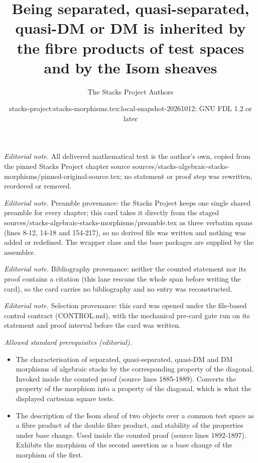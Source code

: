 \documentclass[10pt,a4paper]{amsart}
\title{Being separated, quasi-separated, quasi-DM or DM is inherited by the fibre products of test spaces and by the Isom sheaves}
\author{The Stacks Project Authors}
\date{stacks-project:stacks-morphisms.tex:local-snapshot-20261012; GNU FDL 1.2 or later}
\theoremstyle{plain}
\theoremstyle{definition}
\theoremstyle{remark}
\numberwithin{equation}{subsection}
\begin{document}
\maketitle
\noindent\textit{Editorial note.} All delivered mathematical text is the author's own, copied from the pinned Stacks Project chapter source sources/stacks-algebraic-stacks-morphisms/pinned-original-source.tex; no statement or proof step was rewritten, reordered or removed.\par\medskip
\noindent\textit{Editorial note.} Preamble provenance: the Stacks Project keeps one single shared preamble for every chapter; this card takes it directly from the staged sources/stacks-algebraic-stacks-morphisms/preamble.tex as three verbatim spans (lines 8-12, 14-18 and 154-217), so no derived file was written and nothing was added or redefined. The wrapper class and the base packages are supplied by the assembler.\par\medskip
\noindent\textit{Editorial note.} Bibliography provenance: neither the counted statement nor its proof contains a citation (this lane rescans the whole span before writing the card), so the card carries no bibliography and no entry was reconstructed.\par\medskip
\noindent\textit{Editorial note.} Selection provenance: this card was opened under the file-based control contract (CONTROL.md), with the mechanical pre-card gate run on its statement and proof interval before the card was written.\par\medskip
\noindent\textit{Allowed standard prerequisites (editorial).}\begin{itemize}
\item The characterisation of separated, quasi-separated, quasi-DM and DM morphisms of algebraic stacks by the corresponding property of the diagonal. Invoked inside the counted proof (source lines 1885-1889). Converts the property of the morphism into a property of the diagonal, which is what the displayed cartesian square tests.
\item The description of the Isom sheaf of two objects over a common test space as a fibre product of the double fibre product, and stability of the properties under base change. Used inside the counted proof (source lines 1892-1897). Exhibits the morphism of the second assertion as a base change of the morphism of the first.
\end{itemize}\medskip
\end{document}
